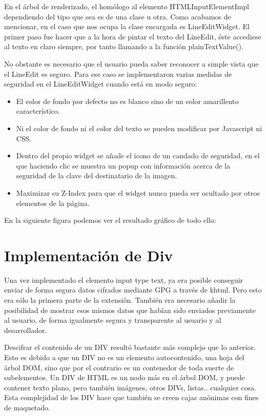En el árbol de renderizado, el homólogo al elemento HTMLInputElementImpl dependiendo del tipo que sea es de una clase u otra. Como acabamos de mencionar, en el caso que nos ocupa la clase encargada es LineEditWidget. El primer paso fue hacer que a la hora de pintar el texto del LineEdit, éste accediese al texto en claro siempre, por tanto llamando a la función plainTextValue().

No obstante es necesario que el usuario pueda saber reconocer a simple vista que el LineEdit es seguro. Para ese caso se implementaron varias medidas de seguridad en el LineEditWidget cuando está en modo seguro:

\begin{itemize}
 \item El color de fondo por defecto no es blanco sino de un color amarillento característico.
 \item Ni el color de fondo ni el color del texto se pueden modificar por Javascript ni CSS.
 \item Dentro del propio widget se añade el icono de un candado de seguridad, en el que haciendo clic se muestra un popup con información acerca de la seguridad de la clave del destinatario de la imagen.
 \item Maximizar su Z-Index para que el widget nunca pueda ser ocultado por otros elementos de la página.
\end{itemize}

En la siguiente figura podemos ver el resultado gráfico de todo ello:


\section{Implementación de Div}\label{div}

Una vez implementado el elemento input type text, ya era posible conseguir enviar de forma segura datos cifrados mediante GPG a través de khtml. Pero esto era sólo la primera parte de la extensión. También era necesario añadir la posibilidad de mostrar esos mismos datos que habían sido enviados previamente al usuario, de forma igualmente segura y transparente al usuario y al desarrollador. 

Descifrar el contenido de un DIV resultó bastante más complejo que lo anterior. Esto es debido a que un DIV no es un elemento autocontenido, una hoja del árbol DOM, sino que por el contrario es un contenedor de toda suerte de subelementos. Un DIV de HTML es un nodo más en el árbol DOM, y puede contener texto plano, pero también imágenes, otros DIVs, listas.. cualquier cosa. Esta complejidad de los DIV hace que también se creen cajas anónimas con fines de maquetado.

